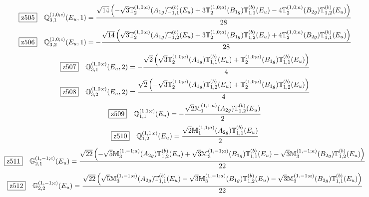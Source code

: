 \documentclass[fleqn,10pt,landscape]{jsarticle}
\begin{document}
\begin{dmath*}
\hspace*{3mm}\fbox{z505}\quad \mathbb{Q}_{3,1}^{(1,0;c)}(E_{u},1)=\frac{\sqrt{14} \left(- \sqrt{3} \mathbb{T}_{2}^{(1,0;a)}(A_{1g}) \mathbb{T}_{1,1}^{(b)}(E_{u}) + 3 \mathbb{T}_{2}^{(1,0;a)}(B_{1g}) \mathbb{T}_{1,1}^{(b)}(E_{u}) - 4 \mathbb{T}_{2}^{(1,0;a)}(B_{2g}) \mathbb{T}_{1,2}^{(b)}(E_{u})\right)}{28}
\end{dmath*}
\begin{dmath*}
\hspace*{3mm}\fbox{z506}\quad \mathbb{Q}_{3,2}^{(1,0;c)}(E_{u},1)=- \frac{\sqrt{14} \left(\sqrt{3} \mathbb{T}_{2}^{(1,0;a)}(A_{1g}) \mathbb{T}_{1,2}^{(b)}(E_{u}) + 3 \mathbb{T}_{2}^{(1,0;a)}(B_{1g}) \mathbb{T}_{1,2}^{(b)}(E_{u}) + 4 \mathbb{T}_{2}^{(1,0;a)}(B_{2g}) \mathbb{T}_{1,1}^{(b)}(E_{u})\right)}{28}
\end{dmath*}
\begin{dmath*}
\hspace*{3mm}\fbox{z507}\quad \mathbb{Q}_{3,1}^{(1,0;c)}(E_{u},2)=- \frac{\sqrt{2} \left(\sqrt{3} \mathbb{T}_{2}^{(1,0;a)}(A_{1g}) \mathbb{T}_{1,1}^{(b)}(E_{u}) + \mathbb{T}_{2}^{(1,0;a)}(B_{1g}) \mathbb{T}_{1,1}^{(b)}(E_{u})\right)}{4}
\end{dmath*}
\begin{dmath*}
\hspace*{3mm}\fbox{z508}\quad \mathbb{Q}_{3,2}^{(1,0;c)}(E_{u},2)=\frac{\sqrt{2} \left(- \sqrt{3} \mathbb{T}_{2}^{(1,0;a)}(A_{1g}) \mathbb{T}_{1,2}^{(b)}(E_{u}) + \mathbb{T}_{2}^{(1,0;a)}(B_{1g}) \mathbb{T}_{1,2}^{(b)}(E_{u})\right)}{4}
\end{dmath*}
\begin{dmath*}
\hspace*{3mm}\fbox{z509}\quad \mathbb{Q}_{1,1}^{(1,1;c)}(E_{u})=- \frac{\sqrt{2} \mathbb{M}_{1}^{(1,1;a)}(A_{2g}) \mathbb{T}_{1,2}^{(b)}(E_{u})}{2}
\end{dmath*}
\begin{dmath*}
\hspace*{3mm}\fbox{z510}\quad \mathbb{Q}_{1,2}^{(1,1;c)}(E_{u})=\frac{\sqrt{2} \mathbb{M}_{1}^{(1,1;a)}(A_{2g}) \mathbb{T}_{1,1}^{(b)}(E_{u})}{2}
\end{dmath*}
\begin{dmath*}
\hspace*{3mm}\fbox{z511}\quad \mathbb{G}_{2,1}^{(1,-1;c)}(E_{u})=\frac{\sqrt{22} \left(- \sqrt{5} \mathbb{M}_{3}^{(1,-1;a)}(A_{2g}) \mathbb{T}_{1,2}^{(b)}(E_{u}) + \sqrt{3} \mathbb{M}_{3}^{(1,-1;a)}(B_{1g}) \mathbb{T}_{1,1}^{(b)}(E_{u}) - \sqrt{3} \mathbb{M}_{3}^{(1,-1;a)}(B_{2g}) \mathbb{T}_{1,2}^{(b)}(E_{u})\right)}{22}
\end{dmath*}
\begin{dmath*}
\hspace*{3mm}\fbox{z512}\quad \mathbb{G}_{2,2}^{(1,-1;c)}(E_{u})=\frac{\sqrt{22} \left(\sqrt{5} \mathbb{M}_{3}^{(1,-1;a)}(A_{2g}) \mathbb{T}_{1,1}^{(b)}(E_{u}) - \sqrt{3} \mathbb{M}_{3}^{(1,-1;a)}(B_{1g}) \mathbb{T}_{1,2}^{(b)}(E_{u}) - \sqrt{3} \mathbb{M}_{3}^{(1,-1;a)}(B_{2g}) \mathbb{T}_{1,1}^{(b)}(E_{u})\right)}{22}
\end{dmath*}
\vspace{5mm}
\end{document}
